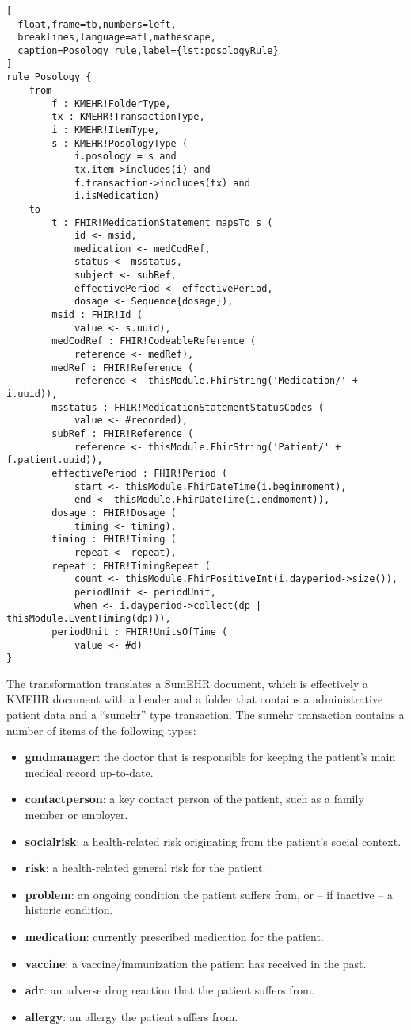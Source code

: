 \documentclass[a4paper]{scrartcl}
\begin{document}
\begin{lstlisting}[
  float,frame=tb,numbers=left,
  breaklines,language=atl,mathescape,
  caption=Posology rule,label={lst:posologyRule}
]
rule Posology {
	from
		f : KMEHR!FolderType,
		tx : KMEHR!TransactionType,
		i : KMEHR!ItemType,
		s : KMEHR!PosologyType (
			i.posology = s and
			tx.item->includes(i) and
			f.transaction->includes(tx) and
			i.isMedication)
	to
		t : FHIR!MedicationStatement mapsTo s (
			id <- msid,
			medication <- medCodRef,
			status <- msstatus,
			subject <- subRef,
			effectivePeriod <- effectivePeriod,
			dosage <- Sequence{dosage}),
		msid : FHIR!Id (
			value <- s.uuid),
		medCodRef : FHIR!CodeableReference (
			reference <- medRef),
		medRef : FHIR!Reference (
			reference <- thisModule.FhirString('Medication/' + i.uuid)),
		msstatus : FHIR!MedicationStatementStatusCodes (
			value <- #recorded),
		subRef : FHIR!Reference (
			reference <- thisModule.FhirString('Patient/' + f.patient.uuid)),
		effectivePeriod : FHIR!Period (
			start <- thisModule.FhirDateTime(i.beginmoment),
			end <- thisModule.FhirDateTime(i.endmoment)),
		dosage : FHIR!Dosage (
			timing <- timing),
		timing : FHIR!Timing (
			repeat <- repeat),
		repeat : FHIR!TimingRepeat (
			count <- thisModule.FhirPositiveInt(i.dayperiod->size()),
			periodUnit <- periodUnit,
			when <- i.dayperiod->collect(dp | thisModule.EventTiming(dp))),
		periodUnit : FHIR!UnitsOfTime (
			value <- #d)
}
\end{lstlisting}

The transformation translates a SumEHR document, which is effectively a KMEHR
document with a header and a folder that contains a administrative patient
data and a ``sumehr'' type transaction. The sumehr transaction contains a
number of items of the following types:

\begin{itemize}
\item \textbf{gmdmanager}: the doctor that is responsible for keeping the
  patient's main medical record up-to-date.
\item \textbf{contactperson}: a key contact person of the patient, such
  as a family member or employer.
\item \textbf{socialrisk}: a health-related risk originating from the
  patient's social context.
\item \textbf{risk}: a health-related general risk for the patient.
\item \textbf{problem}: an ongoing condition the patient suffers from,
  or -- if inactive -- a historic condition.
\item \textbf{medication}: currently prescribed medication for the patient.
\item \textbf{vaccine}: a vaccine/immunization the patient has received
  in the past.
\item \textbf{adr}: an adverse drug reaction that the patient suffers from.
\item \textbf{allergy}: an allergy the patient suffers from.
\end{itemize}
\end{document}
